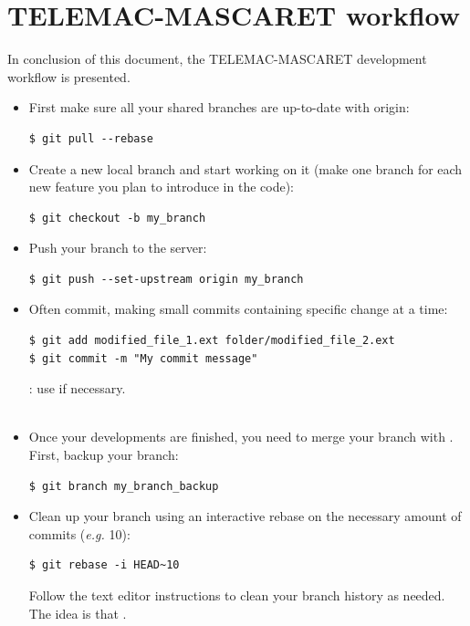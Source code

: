 \chapter{TELEMAC-MASCARET  workflow}

In conclusion of this document, the TELEMAC-MASCARET  development
workflow is presented.

\begin{itemize}

\item First make sure all your shared branches are up-to-date with origin:
\begin{lstlisting}
$ git pull --rebase
\end{lstlisting}

\item Create a new local branch and start working on it (make one branch for
each new feature you plan to introduce in the code):
\begin{lstlisting}
$ git checkout -b my_branch
\end{lstlisting}

\item Push your branch to the server:
\begin{lstlisting}
$ git push --set-upstream origin my_branch
\end{lstlisting}

\item Often commit, making small commits containing specific change at a time:
\begin{lstlisting}
$ git add modified_file_1.ext folder/modified_file_2.ext
$ git commit -m "My commit message"
\end{lstlisting}
: use  if necessary.\\

\\


\item Once your developments are finished, you need to merge your branch with
. First, backup your branch:
\begin{lstlisting}
$ git branch my_branch_backup
\end{lstlisting}

\item Clean up your branch using an interactive rebase on the necessary amount
of commits (\textit{e.g.} 10):
\begin{lstlisting}
$ git rebase -i HEAD~10
\end{lstlisting}
Follow the text editor instructions to clean your branch history as needed. The
idea is that .


\end{itemize}
